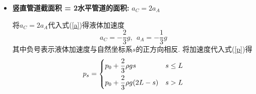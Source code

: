 \begin{solution}
\begin{itemize}
\item \textbf{竖直管道截面积 = 2水平管道的面积:} $a_C = 2a_A$


将$a_C = 2a_A$代入式(\ref{a})得液体加速度
\[
a_C =  - \frac{2}{3}g,{~~} a_A = - \frac{1}{3}g
\]
其中负号表示液体加速度与自然坐标系$s$的正方向相反. 将加速度代入式(\ref{p})得
\[
p_s = \begin{dcases}
p_0 + \frac{2}{3}\rho gs & s \leq L \\
p_0 + \frac{2}{3}\rho g(2L-s) & s > L
\end{dcases}
\]

\end{itemize}



\end{solution} 
